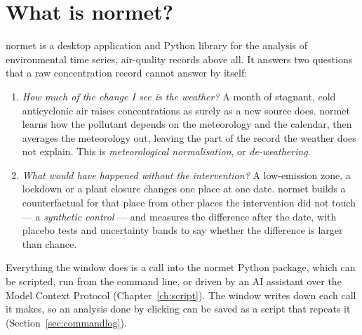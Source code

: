 \documentclass[11pt]{report}
\newcommand{\nosep}{\setlength{\itemsep}{0pt}\setlength{\parskip}{0pt}\setlength{\topsep}{2pt}}
\newcommand{\nm}{\textsf{normet}}
\begin{document}
\section{What is normet?}
\nm{} is a desktop application and Python library for the analysis of environmental
time series, air-quality records above all. It answers two questions that a raw
concentration record cannot answer by itself:
\begin{enumerate}\nosep
  \item \emph{How much of the change I see is the weather?} A month of stagnant,
        cold anticyclonic air raises concentrations as surely as a new source does.
        \nm{} learns how the pollutant depends on the meteorology and the calendar, then
        averages the meteorology out, leaving the part of the record the weather does
        not explain. This is \emph{meteorological normalisation}, or
        \emph{de-weathering}.
  \item \emph{What would have happened without the intervention?} A low-emission
        zone, a lockdown or a plant closure changes one place at one date. \nm{}
        builds a counterfactual for that place from other places the intervention did
        not touch --- a \emph{synthetic control} --- and measures the difference after
        the date, with placebo tests and uncertainty bands to say whether the
        difference is larger than chance.
\end{enumerate}
Everything the window does is a call into the \nm{} Python package, which can be
scripted, run from the command line, or driven by an AI assistant over the Model
Context Protocol (Chapter~\ref{ch:script}). The window writes down each call it makes,
so an analysis done by clicking can be saved as a script that repeats it
(Section~\ref{sec:commandlog}).
\end{document}
